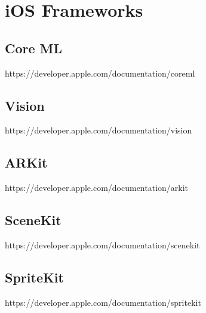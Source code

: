 \section{iOS Frameworks}

\subsection{Core ML}
https://developer.apple.com/documentation/coreml

\subsection{Vision}
https://developer.apple.com/documentation/vision

\subsection{ARKit}
https://developer.apple.com/documentation/arkit

\subsection{SceneKit}
https://developer.apple.com/documentation/scenekit

\subsection{SpriteKit}
https://developer.apple.com/documentation/spritekit
